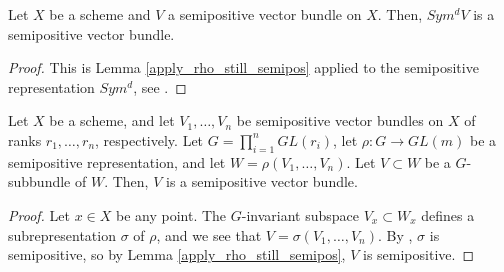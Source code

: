 \begin{lemma}\label{symd_semipos}
Let $X$ be a scheme and $V$ a semipositive vector bundle on $X$. 
Then, $Sym^dV$ is a semipositive vector bundle.
\end{lemma}
\begin{proof}
This is Lemma \ref{apply_rho_still_semipos} applied to the semipositive representation $Sym^d$, see .
\end{proof}


\begin{lemma}
Let $X$ be a scheme, and let $V_1,\ldots,V_n$ be semipositive vector bundles on $X$ of ranks $r_1,\ldots,r_n$, respectively. 
Let $G=\prod_{i=1}^{n}GL(r_i)$, let $\rho:G\to GL(m)$ be a semipositive representation, and let $W=\rho(V_1,\ldots,V_n)$.
Let $V\subset W$ be a $G$-subbundle of $W$. 
Then, $V$ is a semipositive vector bundle.
\end{lemma}

\begin{proof}
Let $x\in X$ be any point.
The $G$-invariant subspace $V_x\subset W_x$ defines a subrepresentation $\sigma$ of $\rho$, and we see that $V=\sigma(V_1,\ldots,V_n)$.
By , $\sigma$ is semipositive, so by Lemma \ref{apply_rho_still_semipos}, $V$ is semipositive.
\end{proof}







